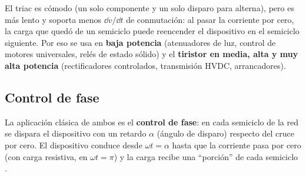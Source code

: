 \begin{intuicion}
El triac es cómodo (un solo componente y un solo disparo para alterna), pero es más lento y soporta
menos $\dd v/\dd t$ de conmutación: al pasar la corriente por cero, la carga que quedó de un
semiciclo puede reencender el dispositivo en el semiciclo siguiente. Por eso se usa en \textbf{baja
potencia} (atenuadores de luz, control de motores universales, relés de estado sólido) y el
\textbf{tiristor en media, alta y muy alta potencia} (rectificadores controlados, transmisión HVDC,
arrancadores).
\end{intuicion}

\subsection{Control de fase}

La aplicación clásica de ambos es el \textbf{control de fase}: en cada semiciclo de la red se
dispara el dispositivo con un retardo $\alpha$ (ángulo de disparo) respecto del cruce por cero. El
dispositivo conduce desde $\omega t=\alpha$ hasta que la corriente pasa por cero (con carga
resistiva, en $\omega t=\pi$) y la carga recibe una ``porción'' de cada semiciclo .

